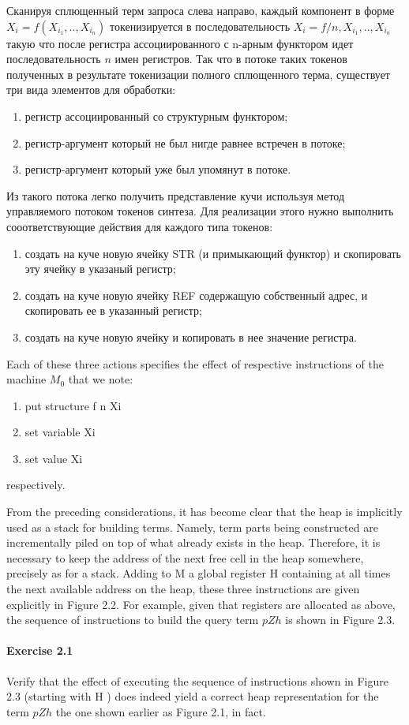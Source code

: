 Сканируя сплющенный терм запроса слева направо, каждый компонент в форме
$X_i=f(X_{i_1},..,X_{i_n})$ токенизируется в последовательность
$X_i=f/n,X_{i_1},..,X_{i_n}$ такую что после регистра ассоциированного с n-арным
функтором идет последовательность $n$ имен регистров. Так что в потоке таких
токенов полученных в результате токенизации полного сплющенного терма,
существует три вида элементов для обработки:
\begin{enumerate}
  \item 
регистр ассоциированный со структурным функтором;
  \item 
регистр-аргумент который не был нигде равнее встречен в потоке;
  \item 
регистр-аргумент который уже был упомянут в потоке.
\end{enumerate}

Из такого потока легко получить представление кучи используя метод управляемого
потоком токенов синтеза. Для реализации этого нужно выполнить сооответствующие
действия для каждого типа токенов:
\begin{enumerate}
  \item 
создать на куче новую ячейку STR (и примыкающий функтор) и скопировать эту
ячейку в указаный регистр;
  \item 
создать на куче новую ячейку REF содержащую собственный адрес, и скопировать
ее в указанный регистр;
  \item 
создать на куче новую ячейку и копировать в нее значение регистра.
\end{enumerate}

Each of these three actions specifies the effect of respective instructions of
the machine $M_0$ that we note:
\begin{enumerate}
  \item 
put structure f n Xi
  \item 
set variable Xi
  \item 
set value Xi
\end{enumerate}
respectively.

From the preceding considerations, it has become clear that the heap is implicitly
used as a stack for building terms. Namely, term parts being constructed are
incrementally piled on top of what already exists in the heap. Therefore, it is
necessary to keep the address of the next free cell in the heap somewhere, precisely
as for a stack. Adding to M a global register H containing at all
times the next available address on the heap, these three instructions are given explicitly
in Figure 2.2. For example, given that registers are allocated as above, the
sequence of instructions to build the query term $pZh$
is shown in Figure 2.3.

\paragraph{Exercise 2.1} Verify that the effect of executing the sequence of
instructions shown in Figure 2.3 (starting with H 
 )
does indeed yield a correct heap representation
for the term $pZh$ the one shown earlier as Figure 2.1, in
fact.